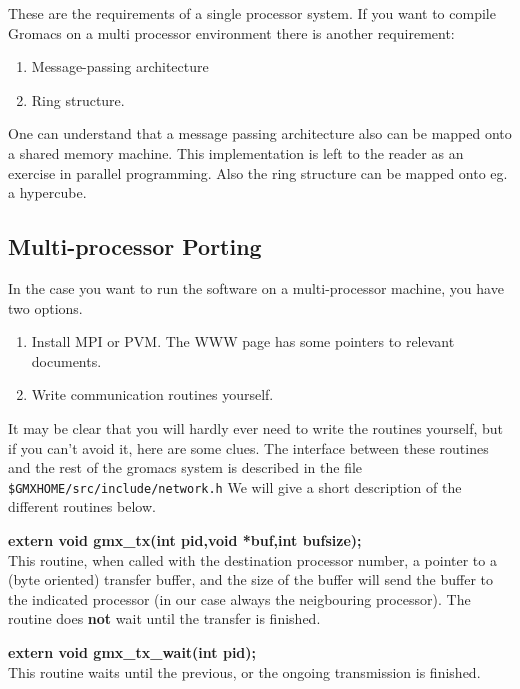These are the requirements of a single processor system. If you want
to compile Gromacs on a multi processor environment there is another
requirement:

\begin{enumerate}
\item Message-passing architecture
\item Ring structure.
\end{enumerate}

One can understand that a message passing architecture also can be
mapped onto a shared memory machine. This implementation is left to
the reader as an exercise in parallel programming. Also the ring
structure can be mapped onto eg. a hypercube.

\subsection{Multi-processor Porting}

In the case you want to run the {\gromacs} software on a
multi-processor machine, you have two options.
\begin{enumerate}
\item	Install MPI or PVM. The {\gromacs} WWW page has some pointers
	to relevant documents.
\item	Write communication routines yourself. 
\end{enumerate}

It may be clear that you will hardly ever need to write the routines
yourself, but if you can't avoid it, here are some clues.
The interface between these routines and the
rest of the gromacs system is described in the file {\tt
\$GMXHOME/src/include/network.h} We will give a short description of the
different routines below.

{\bf extern void gmx\_tx(int pid,void *buf,int bufsize);}\\ 

This routine, when called with the destination processor number, a
pointer to a (byte oriented) transfer buffer, and the size of the
buffer will send the buffer to the indicated processor (in our case
always the neigbouring processor). The routine does {\bf not} wait
until the transfer is finished.

\smallskip

{\bf extern void gmx\_tx\_wait(int pid);}\\
This routine waits until the previous, or the ongoing transmission is finished.

\smallskip


